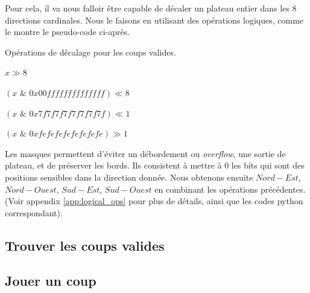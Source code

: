 Pour cela, il va nous falloir être capable de décaler un plateau entier dans les 8 directions cardinales. Nous le faisons en utilisant des opérations logiques, comme le montre le pseudo-code ci-après.
\begin{algorithm}
    \caption{Opérations de décalage pour les coups valides.}
    \begin{algorithmic}[1]
        \State \Return $x \gg 8$
    \EndFunction
    
        \State \Return $(x \,\, \& \,\, 0x00ffffffffffffff) \ll 8$
    \EndFunction
    
        \State \Return $(x \,\, \& \,\, 0x7f7f7f7f7f7f7f7f) \ll 1$
    \EndFunction
    
        \State \Return $(x \,\, \& \,\, 0xfefefefefefefefe) \gg 1$
    \EndFunction
    \end{algorithmic}
    \label{alg:shift_ops}
\end{algorithm}

Les masques permettent d'éviter un débordement ou \textit{overflow}, une sortie de plateau, et de préserver les bords. Ils consistent à mettre à 0 les bits qui sont des positions sensibles dans la direction donnée. Nous obtenons ensuite $Nord-Est$, $Nord-Ouest$, $Sud-Est$, $Sud-Ouest$ en combinant les opérations précédentes. (Voir appendix \ref{app:logical_ops} pour plus de détails, ainsi que les codes python correspondant).

\subsection{Trouver les coups valides}
\label{subsec:valid_moves}

\subsection{Jouer un coup}
\label{subsec:play}

